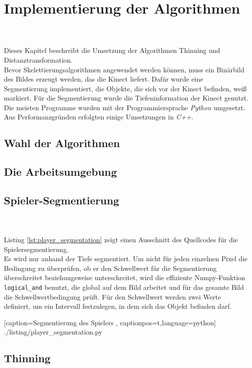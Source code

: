 \chapter{Implementierung der Algorithmen}
\\\\
Dieses Kapitel beschreibt die Umsetzung der Algorithmen Thinning und Distanztransformation.\\
Bevor Skelettierungsalgorithmen angewendet werden können, muss ein Binärbild des Bildes erzeugt werden, 
das die Kinect liefert. Dafür wurde eine Segmentierung implementiert, die Objekte, die sich vor der
Kinect befinden, weiß markiert. Für die Segmentierung wurde die Tiefeninformation der Kinect genutzt.\\
Die meisten Programme wurden mit der Programmiersprache \emph{Python} umgesetzt. Aus Performanzgründen 
erfolgten einige Umsetzungen in \emph{C++}. 
\section{Wahl der Algorithmen}
\section{Die Arbeitsumgebung}
\section{Spieler-Segmentierung}
\\\\
Listing \ref{lst:player_segmentation} zeigt einen Ausschnitt des Quellcodes für die Spielersegmentierung.\\
Es wird nur anhand der Tiefe segmentiert. Um nicht für jeden einzelnen Pixel die Bedingung zu überprüfen, ob er den Schwellwert für die Segmentierung überschreitet beziehungsweise unterschreitet, wird die effiziente Numpy-Funktion \texttt{logical\_and} benutzt, die global auf dem Bild arbeitet und für das gesamte Bild die Schwellwertbedingung prüft. Für den Schwellwert werden zwei 
Werte definiert, um ein Intervall festzulegen, in dem sich das Objekt befinden darf. 

    [caption={Segmentierung des Spielers}
       \label{lst:player_segmentation},
       captionpos=t,language=python]
 {./listing/player_segmentation.py}
\section{Thinning}  %
